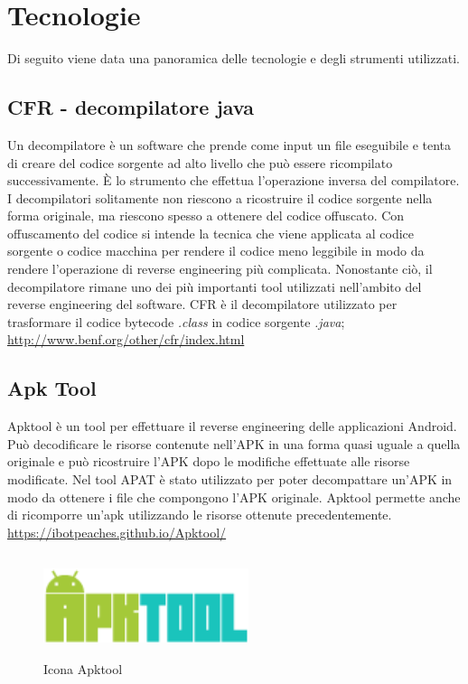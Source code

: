 
\section{Tecnologie}\label{sec:tecnologie}
Di seguito viene data una panoramica delle tecnologie e degli strumenti utilizzati.

\subsection*{CFR - decompilatore java}
Un decompilatore è un software che prende come input un file eseguibile e tenta di creare del codice sorgente ad alto livello che può essere ricompilato successivamente.
È lo strumento che effettua l'operazione inversa del compilatore.
I decompilatori solitamente non riescono a ricostruire il codice sorgente nella forma originale, ma riescono spesso a ottenere del codice offuscato.
Con offuscamento del codice si intende la tecnica che viene applicata al codice sorgente o codice macchina per rendere il codice meno leggibile in modo da rendere l'operazione di reverse engineering più complicata.
Nonostante ciò, il decompilatore rimane uno dei più importanti tool utilizzati nell'ambito del reverse engineering del software.
CFR è il decompilatore utilizzato per trasformare il codice bytecode \textit{.class} in codice sorgente \textit{.java};
\url{http://www.benf.org/other/cfr/index.html}

\subsection*{Apk Tool}
Apktool è un tool per effettuare il reverse engineering delle applicazioni Android.
Può decodificare le risorse contenute nell'APK in una forma quasi uguale a quella originale e può ricostruire l'APK dopo le modifiche effettuate alle risorse modificate.
Nel tool APAT è stato utilizzato per poter decompattare un'APK in modo da ottenere i file che compongono l'APK originale.
Apktool permette anche di ricomporre un'apk utilizzando le risorse ottenute precedentemente.
\url{https://ibotpeaches.github.io/Apktool/}
\begin{figure}[H]
    \centering
    \includegraphics[width=6cm, height=3cm]{./immagini/apktool.png}
    \caption{Icona Apktool}\label{fig:apktool}
\end{figure}

